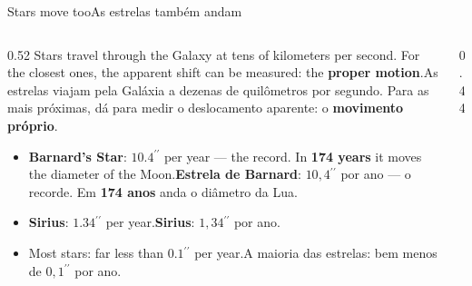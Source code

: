 \documentclass[aspectratio=169,11pt]{beamer}
\newcommand{\tr}[2]{\ifEN#2\else#1\fi}
\newcommand{\bnum}[1]{\textbf{\textcolor{mTeal}{#1}}}
\newcommand{\asec}{\ensuremath{{}^{\prime\prime}}}
\newcommand{\gr}{\ensuremath{{}^{\circ}}}
\begin{document}
\begin{frame}{\tr{As estrelas também andam}{Stars move too}}
  \begin{columns}[T]
    \begin{column}{0.52\textwidth}
      \tr{As estrelas viajam pela Galáxia a dezenas de quilômetros por segundo. Para as
      mais próximas, dá para medir o deslocamento aparente: o \bnum{movimento próprio}.}{Stars
      travel through the Galaxy at tens of kilometers per second. For the closest ones, the
      apparent shift can be measured: the \bnum{proper motion}.}
      \medskip
      \begin{itemize}
        \setlength{\itemsep}{3pt}
        \item \tr{\textbf{Estrela de Barnard}: $10{,}4\asec$ por ano --- o recorde. Em
              \bnum{174 anos} anda o diâmetro da Lua.}{\textbf{Barnard's Star}: $10.4\asec$ per
              year --- the record. In \bnum{174 years} it moves the diameter of the Moon.}
        \item \tr{\textbf{Sirius}: $1{,}34\asec$ por ano.}{\textbf{Sirius}: $1.34\asec$ per
              year.}
        \item \tr{A maioria das estrelas: bem menos de $0{,}1\asec$ por ano.}{Most stars: far
              less than $0.1\asec$ per year.}
      \end{itemize}
    \end{column}
    \begin{column}{0.44\textwidth}
      \centering
    \end{column}
  \end{columns}
\end{frame}
\end{document}
